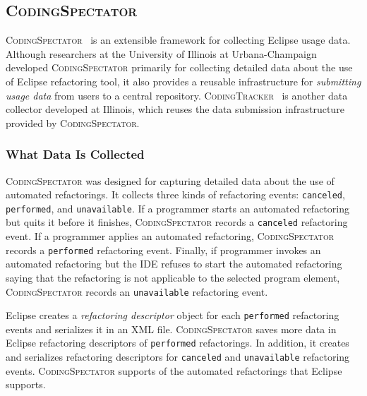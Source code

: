 \newcommand\CodingSpectator{\textsc{CodingSpectator}}

\newcommand\CodingTracker{\textsc{CodingTracker}}

\newcommand\Performed{\texttt{performed}}

\newcommand\Canceled{\texttt{canceled}}

\newcommand\Unavailable{\texttt{unavailable}}



\subsection{\CodingSpectator}

\CodingSpectator~\cite{CodingSpectatorWebPage, VakilianETAL2011Richer,
VakilianETAL2012UseDisuseMisuse, VakilianETAL2013Compositional} is an extensible
framework for collecting Eclipse usage data. Although researchers at the
University of Illinois at Urbana-Champaign developed \CodingSpectator{}
primarily for collecting detailed data about the use of Eclipse refactoring
tool, it also provides a reusable infrastructure for \emph{submitting usage
data} from users to a central repository.
\CodingTracker~\cite{NegaraETAL2012Dangerous, NegaraETAL2013ManualRefactorings,
CodingTrackerWebPage} is another data collector developed at Illinois, which
reuses the data submission infrastructure provided by \CodingSpectator.

\subsubsection{What Data Is Collected}

\CodingSpectator{} was designed for capturing detailed data about the use of
automated refactorings. It collects three kinds of refactoring events:
\Canceled, \Performed, and \Unavailable. If a programmer starts an automated
refactoring but quits it before it finishes, \CodingSpectator{} records a
\Canceled{} refactoring event. If a programmer applies an automated refactoring,
\CodingSpectator{} records a \Performed{} refactoring event. Finally, if
programmer invokes an automated refactoring but the IDE refuses to start the
automated refactoring saying that the refactoring is not applicable to the
selected program element, \CodingSpectator{} records an \Unavailable{}
refactoring event.

Eclipse creates a \emph{refactoring descriptor} object for each \Performed{}
refactoring events and serializes it in an XML file. \CodingSpectator{} saves
more data in Eclipse refactoring descriptors of \Performed{} refactorings. In
addition, it creates and serializes refactoring descriptors for \Canceled{} and
\Unavailable{} refactoring events. \CodingSpectator{} supports
 of the
 automated refactorings that Eclipse
supports.

